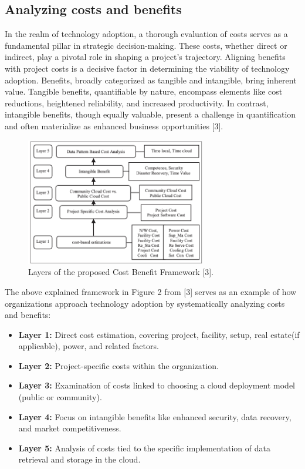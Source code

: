 \documentclass{article}
\begin{document}
\subsection{Analyzing costs and benefits}
In the realm of technology adoption, a thorough evaluation of costs serves as a fundamental pillar in strategic decision-making. These costs, whether direct or indirect, play a pivotal role in shaping a project's trajectory. Aligning benefits with project costs is a decisive factor in determining the viability of technology adoption. Benefits, broadly categorized as tangible and intangible, bring inherent value. Tangible benefits, quantifiable by nature, encompass elements like cost reductions, heightened reliability, and increased productivity. In contrast, intangible benefits, though equally valuable, present a challenge in quantification and often materialize as enhanced business opportunities [3].

\begin{figure}[h]
    \centering
    \includegraphics[width=0.7\textwidth]{Figure2.png}
    \caption{Layers of the proposed Cost Benefit Framework [3].}
    \label{fig:conceptual-model}
\end{figure}

\noindent The above explained framework in Figure 2 from [3] serves as an example of how organizations approach technology adoption by systematically analyzing costs and benefits:
\begin{itemize}
    \item \textbf{Layer 1:} Direct cost estimation, covering project, facility, setup, real estate(if applicable), power, and related factors.
    \item \textbf{Layer 2:} Project-specific costs within the organization.
    \item \textbf{Layer 3:} Examination of costs linked to choosing a cloud deployment model (public or community).
    \item \textbf{Layer 4:} Focus on intangible benefits like enhanced security, data recovery, and market competitiveness.
    \item \textbf{Layer 5:} Analysis of costs tied to the specific implementation of data retrieval and storage in the cloud.
\end{itemize}
\end{document}
